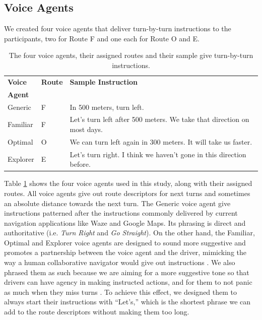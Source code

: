 \subsection{Voice Agents}
\label{sec:agents}

We created four voice agents that deliver turn-by-turn instructions to the participants, two for Route F and one each for Route O and E. 

\begin{table}[h]
	\centering
	\caption{The four voice agents, their assigned routes and their sample give turn-by-turn instructions.}
	\begin{tabular}{l l l}
	    \toprule
		\textbf{Voice} & \textbf{Route} & \textbf{Sample Instruction} \\
		\textbf{Agent} & & \\
		\midrule
		Generic & F & In 500 meters, turn left. \\
		Familiar & F & Let's turn left after 500 meters. We take that direction on most days. \\
		Optimal & O & We can turn left again in 300 meters. It will take us faster.  \\
		Explorer & E & Let's turn right. I think we haven't gone in this direction before. \\
		\bottomrule
	\end{tabular}
	\label{tab:agents}
\end{table}

Table \ref{tab:agents} shows the four voice agents used in this study, along with their assigned routes. All voice agents give out route descriptors for next turns and sometimes an absolute distance towards the next turn. The Generic voice agent give instructions patterned after the instructions commonly delivered by current navigation applications like Waze and Google Maps. Its phrasing is direct and authoritative (i.e. \textit{Turn Right} and \textit{Go Straight}). On the other hand, the Familiar, Optimal and Explorer voice agents are designed to sound more suggestive and promotes a partnership between the voice agent and the driver, mimicking the way a human collaborative navigator would give out instructions \cite{Antrobus2017Driver-PassengerSystems}. We also phrased them as such because we are aiming for a more suggestive tone so that drivers can have agency in making instructed actions, and for them to not panic as much when they miss turns \cite{Brown2012TheGPS, Samson:2019:EFI:3290605.3300601}. To achieve this effect, we designed them to always start their instructions with ``Let's,'' which is the shortest phrase we can add to the route descriptors without making them too long. 

